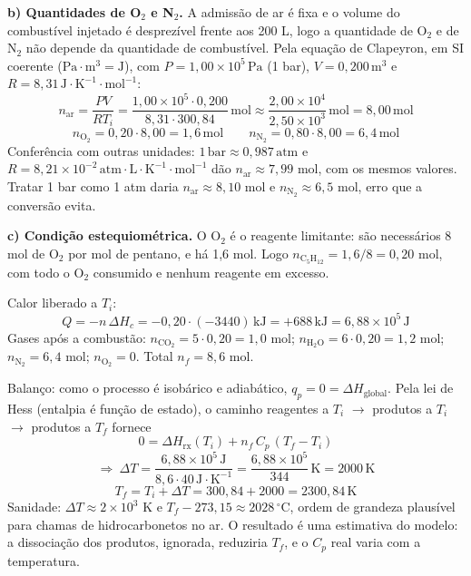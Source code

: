 \documentclass{article}%
\begin{document}
\textbf{b) Quantidades de O$_2$ e N$_2$.} A admissão de ar é fixa e o volume do combustível injetado é desprezível frente aos 200 L, logo a quantidade de O$_2$ e de N$_2$ não depende da quantidade de combustível. Pela equação de Clapeyron, em SI coerente ($\text{Pa}\cdot\text{m}^3=\text{J}$), com $P=1{,}00\times10^{5}\,\text{Pa}$ (1 bar), $V=0{,}200\,\text{m}^3$ e $R=8{,}31\,\text{J}\cdot\text{K}^{-1}\cdot\text{mol}^{-1}$:
\[
n_{\text{ar}}=\frac{PV}{RT_i}=\frac{1{,}00\times10^{5}\cdot0{,}200}{8{,}31\cdot300{,}84}\,\text{mol}\approx\frac{2{,}00\times10^{4}}{2{,}50\times10^{3}}\,\text{mol}=8{,}00\,\text{mol}
\]
\[
n_{\mathrm{O_2}}=0{,}20\cdot8{,}00=1{,}6\,\text{mol}\qquad n_{\mathrm{N_2}}=0{,}80\cdot8{,}00=6{,}4\,\text{mol}
\]
Conferência com outras unidades: $1\,\text{bar}\approx0{,}987\,\text{atm}$ e $R=8{,}21\times10^{-2}\,\text{atm}\cdot\text{L}\cdot\text{K}^{-1}\cdot\text{mol}^{-1}$ dão $n_{\text{ar}}\approx7{,}99$ mol, com os mesmos valores. Tratar 1 bar como 1 atm daria $n_{\text{ar}}\approx8{,}10$ mol e $n_{\mathrm{N_2}}\approx6{,}5$ mol, erro que a conversão evita.

\textbf{c) Condição estequiométrica.} O O$_2$ é o reagente limitante: são necessários 8 mol de O$_2$ por mol de pentano, e há 1,6 mol. Logo $n_{\mathrm{C_5H_{12}}}=1{,}6/8=0{,}20$ mol, com todo o O$_2$ consumido e nenhum reagente em excesso.

Calor liberado a $T_i$:
\[
Q=-n\,\Delta H_c=-0{,}20\cdot(-3440)\,\text{kJ}=+688\,\text{kJ}=6{,}88\times10^{5}\,\text{J}
\]
Gases após a combustão: $n_{\mathrm{CO_2}}=5\cdot0{,}20=1{,}0$ mol; $n_{\mathrm{H_2O}}=6\cdot0{,}20=1{,}2$ mol; $n_{\mathrm{N_2}}=6{,}4$ mol; $n_{\mathrm{O_2}}=0$. Total $n_f=8{,}6$ mol.

Balanço: como o processo é isobárico e adiabático, $q_p=0=\Delta H_{\text{global}}$. Pela lei de Hess (entalpia é função de estado), o caminho reagentes a $T_i$ $\rightarrow$ produtos a $T_i$ $\rightarrow$ produtos a $T_f$ fornece
\[
0=\Delta H_{\text{rx}}(T_i)+n_f\,C_p\,(T_f-T_i)
\]
\[
\Rightarrow\ \Delta T=\frac{6{,}88\times10^{5}\,\text{J}}{8{,}6\cdot40\,\text{J}\cdot\text{K}^{-1}}=\frac{6{,}88\times10^{5}}{344}\,\text{K}=2000\,\text{K}
\]
\[
T_f=T_i+\Delta T=300{,}84+2000=2300{,}84\,\text{K}
\]
Sanidade: $\Delta T\approx2\times10^{3}$ K e $T_f-273{,}15\approx2028\,^{\circ}\text{C}$, ordem de grandeza plausível para chamas de hidrocarbonetos no ar. O resultado é uma estimativa do modelo: a dissociação dos produtos, ignorada, reduziria $T_f$, e o $C_p$ real varia com a temperatura.
\end{document}
